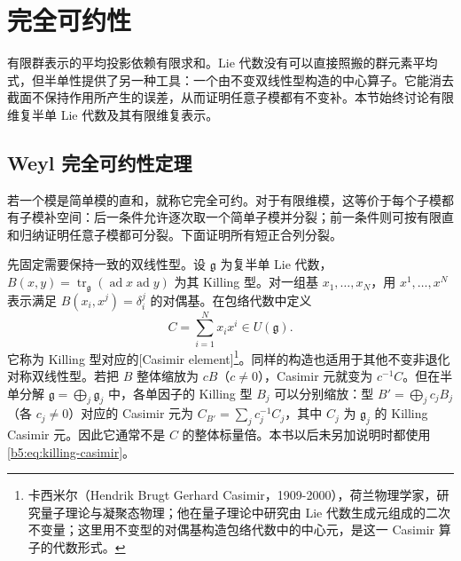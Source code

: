 %
%

\section{完全可约性}
\label{b5:sec:1801}

有限群表示的平均投影依赖有限求和。Lie 代数没有可以直接照搬的群元素平均式，但半单性提供了另一种工具：一个由不变双线性型构造的中心算子。它能消去截面不保持作用所产生的误差，从而证明任意子模都有不变补。本节始终讨论有限维复半单 Lie 代数及其有限维复表示。

\subsection{Weyl 完全可约性定理}
\label{b5:subsec:1801:01}

若一个模是简单模的直和，就称它完全可约。对于有限维模，这等价于每个子模都有子模补空间：后一条件允许逐次取一个简单子模并分裂；前一条件则可按有限直和归纳证明任意子模都可分裂。下面证明所有短正合列分裂。

\ProseParagraphBreak

先固定需要保持一致的双线性型。设 \(\mathfrak g\) 为复半单 Lie 代数，\(B(x,y)=\operatorname{tr}_{\mathfrak g}(\operatorname{ad}x\operatorname{ad}y)\) 为其 Killing 型。对一组基 \(x_1,\ldots,x_N\)，用 \(x^1,\ldots,x^N\) 表示满足 \(B(x_i,x^j)=\delta_i^j\) 的对偶基。在包络代数中定义
\begin{equation}\label{b5:eq:killing-casimir}
	C=\sum_{i=1}^N x_i x^i\in U(\mathfrak g).
\end{equation}
它称为 Killing 型对应的[Casimir element]\footnote{卡西米尔（Hendrik Brugt Gerhard Casimir，1909-2000），荷兰物理学家，研究量子理论与凝聚态物理；他在量子理论中研究由 Lie 代数生成元组成的二次不变量；这里用不变型的对偶基构造包络代数中的中心元，是这一 Casimir 算子的代数形式。}。同样的构造也适用于其他不变非退化对称双线性型。若把 \(B\) 整体缩放为 \(cB\)（\(c\ne0\)），Casimir 元就变为 \(c^{-1}C\)。但在半单分解 \(\mathfrak g=\bigoplus_j\mathfrak g_j\) 中，各单因子的 Killing 型 \(B_j\) 可以分别缩放：型 \(B'=\bigoplus_jc_jB_j\)（各 \(c_j\ne0\)）对应的 Casimir 元为 \(C_{B'}=\sum_jc_j^{-1}C_j\)，其中 \(C_j\) 为 \(\mathfrak g_j\) 的 Killing Casimir 元。因此它通常不是 \(C\) 的整体标量倍。本书以后未另加说明时都使用\eqref{b5:eq:killing-casimir}。

